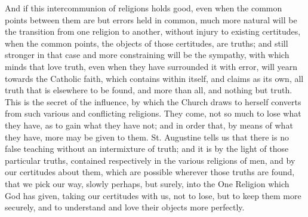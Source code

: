 And if this intercommunion of religions holds good, even when the
common points between them are but errors held in common, much more
natural will be the transition from one religion to another, without
injury to existing certitudes, when the common points, the objects of
those certitudes, are truths; and still stronger in that case and more
constraining will be the sympathy, with which minds that love truth,
even when they have surrounded it with error, will yearn towards the
Catholic faith, which contains within itself, and claims as its own,
all truth that is elsewhere to be found, and more than all, and
nothing but truth. This is the secret of the influence, by which the
Church draws to herself converts from such various and conflicting
religions. They come, not so much to lose what they have, as to gain
what they have not; and in order that, by means of what they have,
more may be given to them. St. Augustine tells us that there is no
false teaching without an intermixture of truth; and it is by the
light of those particular truths, contained respectively in the
various religions of men, and by our certitudes about them, which are
possible wherever those truths are found, that we pick our way, slowly
perhaps, but surely, into the One Religion which God has given, taking
our certitudes with us, not to lose, but to keep them more securely,
and to understand and love their objects more perfectly.

